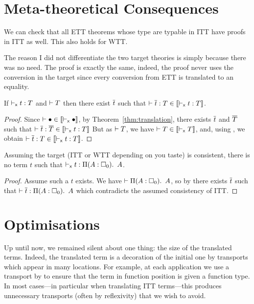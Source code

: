 \section{Meta-theoretical Consequences}

We can check that all \acrshort{ETT} theorems whose type are typable in
\acrshort{ITT} have proofs in \acrshort{ITT} as well.
This also holds for \acrshort{WTT}.

The reason I did not differentiate the two target theories is simply because
there was no need. The proof is exactly the same, indeed, the proof never uses
the conversion in the target since every conversion from \acrshort{ETT} is
translated to an equality.

\begin{corollary}[Conservativity]
  If $\vdash_{\mathsf{x}} t : T$ and $\vdash T$ then there exist $\overline{t}$ such that
    $\vdash \overline{t} : T \in \llbracket \vdash_{\mathsf{x}} t : T \rrbracket$.
\end{corollary}

\begin{proof}
  Since $\vdash \bullet \in \llbracket \vdash_{\mathsf{x}} \bullet \rrbracket$, by
  Theorem~\eqref{thm:translation}, there exists $\overline{t}$ and $\overline{T}$ such
  that
  $\vdash \overline{t} : \overline{T} \in \llbracket \vdash_{\mathsf{x}} t : T \rrbracket$
  But as $\vdash T$, we have
  $\vdash T \in \llbracket \vdash_{\mathsf{x}} T \rrbracket$, and,
  using , we obtain
  $\vdash \overline{t} : T \in \llbracket \vdash_{\mathsf{x}} t : T \rrbracket$.
\end{proof}

\begin{corollary}
  Assuming the target (\acrshort{ITT} or \acrshort{WTT} depending on you taste)
  is consistent, there is no term $t$ such that
  $\vdash_{\mathsf{x}} t : \mathop{\Pi(A:\square_{0}).\ }{A}$.
\end{corollary}

\begin{proof}
  Assume such a $t$ exists.
  We have $\vdash \mathop{\Pi(A:\square_{0}).\ }{A}$, so by 
  there exists $\overline{t}$ such that $\vdash \overline{t} : \mathop{\Pi(A:\square_{0}).\ }{A}$ which
  contradicts the assumed consistency of ITT.
\end{proof}

\section{Optimisations}

Up until now, we remained silent about one thing: the size of the
translated terms. Indeed, the translated term is a decoration of the
initial one by transports which appear in many locations. For example,
at each application we use a transport by  to
ensure that the term in function position is given a function type. In
most cases---in particular when translating ITT terms---this produces
unnecessary transports (often by reflexivity) that we wish to avoid.

